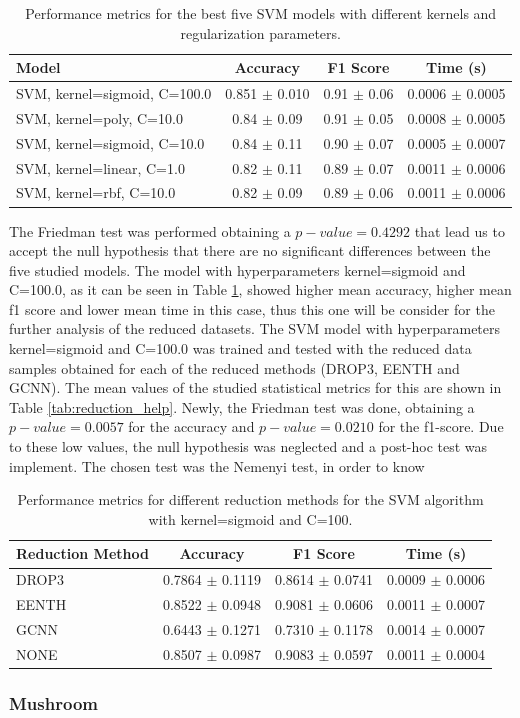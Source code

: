 \begin{table}[h!]
\centering
\begin{tabular}{|l|c|c|c|}
\hline
\textbf{Model} & \textbf{Accuracy} & \textbf{F1 Score} & \textbf{Time (s)} \\
\hline
SVM, kernel=sigmoid, C=100.0 & 0.851 $\pm$ 0.010 & 0.91 $\pm$ 0.06 & 0.0006 $\pm$ 0.0005 \\
\hline
SVM, kernel=poly, C=10.0     & 0.84 $\pm$ 0.09 & 0.91 $\pm$ 0.05 & 0.0008 $\pm$ 0.0005 \\
\hline
SVM, kernel=sigmoid, C=10.0  & 0.84 $\pm$ 0.11 & 0.90 $\pm$ 0.07 & 0.0005 $\pm$ 0.0007 \\
\hline
SVM, kernel=linear, C=1.0    & 0.82 $\pm$ 0.11 & 0.89 $\pm$ 0.07 & 0.0011 $\pm$ 0.0006 \\
\hline
SVM, kernel=rbf, C=10.0      & 0.82 $\pm$ 0.09 & 0.89 $\pm$ 0.06 & 0.0011 $\pm$ 0.0006 \\
\hline
\end{tabular}
\caption{Performance metrics for the best five SVM models with different kernels and regularization parameters.}
\label{tab:svm_metrics}
\end{table}

The Friedman test was performed obtaining a $p-value=0.4292$ that lead us to accept the null hypothesis that there are no significant differences between the five studied models. The model with hyperparameters kernel=sigmoid and C=100.0, as it can be seen in Table \ref{tab:svm_metrics}, showed higher mean accuracy, higher mean f1 score and lower mean time in this case, thus this one will be consider for the further analysis of the reduced datasets.
\newline
The SVM model with hyperparameters kernel=sigmoid and C=100.0 was trained and tested with the reduced data samples obtained for each of the reduced methods (DROP3, EENTH and GCNN). The mean values of the studied statistical metrics for this are shown in Table \ref{tab:reduction_help}. Newly, the Friedman test was done, obtaining a $p-value= 0.0057$ for the accuracy and $p-value=0.0210$ for the f1-score. Due to these low values, the null hypothesis was neglected and a post-hoc test was implement. The chosen test was the Nemenyi test, in order to know

\begin{table}[h!]
\centering
\begin{tabular}{|l|c|c|c|}
\hline
\textbf{Reduction Method} & \textbf{Accuracy} & \textbf{F1 Score} & \textbf{Time (s)} \\
\hline
DROP3 & 0.7864 $\pm$ 0.1119 & 0.8614 $\pm$ 0.0741 & 0.0009 $\pm$ 0.0006 \\
\hline
EENTH & 0.8522 $\pm$ 0.0948 & 0.9081 $\pm$ 0.0606 & 0.0011 $\pm$ 0.0007 \\
\hline
GCNN  & 0.6443 $\pm$ 0.1271 & 0.7310 $\pm$ 0.1178 & 0.0014 $\pm$ 0.0007 \\
\hline
NONE  & 0.8507 $\pm$ 0.0987 & 0.9083 $\pm$ 0.0597 & 0.0011 $\pm$ 0.0004 \\
\hline
\end{tabular}
\caption{Performance metrics for different reduction methods for the SVM algorithm with kernel=sigmoid and C=100.}
\label{tab:reduction_hep}
\end{table}

\subsubsection{Mushroom}
